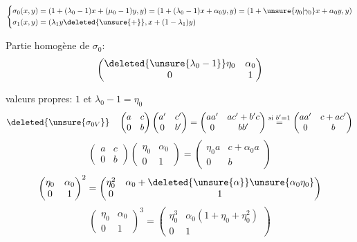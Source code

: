 \[
\left\{\begin{aligned}
\sigma_0(x,y)&=(1+(\lambda_0-1)x+(\mu_0-1)y,y)=(1+(\lambda_0-1)x+\alpha_0y,y)=(1+\unsure{\eta_0|\gamma_0}x+\alpha_0y,y)\\
\sigma_1(x,y)&=(\lambda_1y\deleted{\unsure{+}},x+(1-\lambda_1)y)
\end{aligned}\right.
\]

Partie homogène de $\sigma_0$:
\[
\begin{pmatrix}\deleted{\unsure{\lambda_0-1}}\eta_0&\alpha_0\\0&1\end{pmatrix}
\]

valeurs propres: $1$ et $\lambda_0-1=\eta_0$
\[
\deleted{\unsure{\sigma_{0V}}}\quad
\begin{pmatrix}a&c\\0&b\end{pmatrix}
\begin{pmatrix}a'&c'\\0&b'\end{pmatrix}
=\begin{pmatrix}aa'&ac'+b'c\\0&bb'\end{pmatrix}
\overset{\text{si }b'=1}{=}\begin{pmatrix}aa'&c+ac'\\0&b\end{pmatrix}
\]
\[
\begin{pmatrix}a&c\\0&b\end{pmatrix}
\begin{pmatrix}\eta_0&\alpha_0\\0&1\end{pmatrix}
=\begin{pmatrix}\eta_0a&c+\alpha_0a\\0&b\end{pmatrix}
\]
\[
\begin{pmatrix}\eta_0&\alpha_0\\0&1\end{pmatrix}^{2}
=\begin{pmatrix}\eta_0^2&\alpha_0+\deleted{\unsure{\alpha}}\unsure{\alpha_0\eta_0}\\0&1\end{pmatrix}
\]
\[
\begin{pmatrix}\eta_0&\alpha_0\\0&1\end{pmatrix}^{3}
=\begin{pmatrix}\eta_0^3&\alpha_0(1+\eta_0+\eta_0^2)\\0&1\end{pmatrix}
\]
